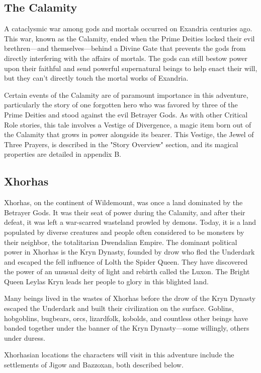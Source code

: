 \documentclass[10pt,a4paper,twoside,twocolumn,openany,nodeprecatedcode]{dndbook}
\begin{document}
\subsection{The Calamity}
A cataclysmic war among gods and mortals occurred on Exandria centuries ago. This war, known as the Calamity, ended when the Prime Deities locked their evil brethren—and themselves—behind a Divine Gate that prevents the gods from directly interfering with the affairs of mortals. The gods can still bestow power upon their faithful and send powerful supernatural beings to help enact their will, but they can't directly touch the mortal works of Exandria.

Certain events of the Calamity are of paramount importance in this adventure, particularly the story of one forgotten hero who was favored by three of the Prime Deities and stood against the evil Betrayer Gods. As with other Critical Role stories, this tale involves a Vestige of Divergence, a magic item born out of the Calamity that grows in power alongside its bearer. This Vestige, the Jewel of Three Prayers, is described in the "Story Overview" section, and its magical properties are detailed in appendix B.

\subsection{Xhorhas}
Xhorhas, on the continent of Wildemount, was once a land dominated by the Betrayer Gods. It was their seat of power during the Calamity, and after their defeat, it was left a war-scarred wasteland prowled by demons. Today, it is a land populated by diverse creatures and people often considered to be monsters by their neighbor, the totalitarian Dwendalian Empire. The dominant political power in Xhorhas is the Kryn Dynasty, founded by drow who fled the Underdark and escaped the fell influence of Lolth the Spider Queen. They have discovered the power of an unusual deity of light and rebirth called the Luxon. The Bright Queen Leylas Kryn leads her people to glory in this blighted land.

Many beings lived in the wastes of Xhorhas before the drow of the Kryn Dynasty escaped the Underdark and built their civilization on the surface. Goblins, hobgoblins, bugbears, orcs, lizardfolk, kobolds, and countless other beings have banded together under the banner of the Kryn Dynasty—some willingly, others under duress.

Xhorhasian locations the characters will visit in this adventure include the settlements of Jigow and Bazzoxan, both described below.
\end{document}

